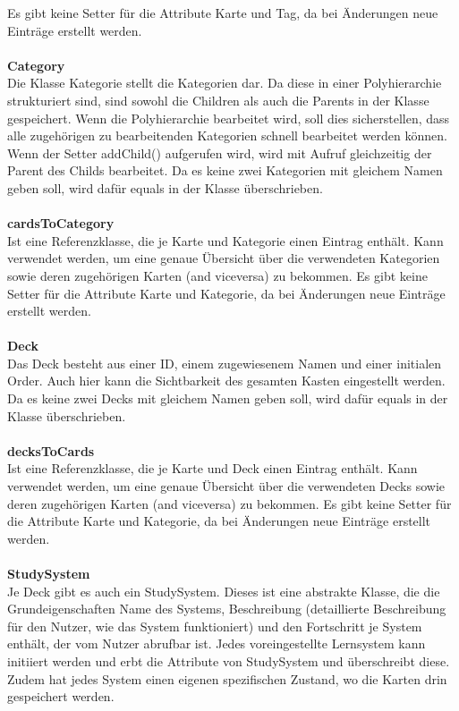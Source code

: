 \documentclass[fontsize=12pt,paper=a4,twoside]{scrartcl}
\begin{document}
Es gibt keine Setter für die Attribute Karte und Tag, da bei Änderungen neue Einträge erstellt werden.
\\
\\
\textbf{Category}\\
Die Klasse Kategorie stellt die Kategorien dar. Da diese in einer Polyhierarchie strukturiert sind, sind sowohl die Children als auch die Parents in der Klasse gespeichert. Wenn die Polyhierarchie bearbeitet wird, soll dies sicherstellen, dass alle zugehörigen zu bearbeitenden Kategorien schnell bearbeitet werden können. Wenn der Setter addChild() aufgerufen wird, wird mit Aufruf gleichzeitig der Parent des Childs bearbeitet.
Da es keine zwei Kategorien mit gleichem Namen geben soll, wird dafür equals in der Klasse überschrieben.
\\
\\
\textbf{cardsToCategory}\\
Ist eine Referenzklasse, die je Karte und Kategorie einen Eintrag enthält. Kann verwendet werden, um eine genaue Übersicht über die verwendeten Kategorien sowie deren zugehörigen Karten (and viceversa) zu bekommen.
Es gibt keine Setter für die Attribute Karte und Kategorie, da bei Änderungen neue Einträge erstellt werden.
\\
\\
\textbf{Deck}\\
Das Deck besteht aus einer ID, einem zugewiesenem Namen und einer initialen Order. Auch hier kann die Sichtbarkeit des gesamten Kasten eingestellt werden. Da es keine zwei Decks mit gleichem Namen geben soll, wird dafür equals in der Klasse überschrieben.
\\
\\
\textbf{decksToCards}\\
Ist eine Referenzklasse, die je Karte und Deck einen Eintrag enthält.
Kann verwendet werden, um eine genaue Übersicht über die verwendeten Decks sowie deren zugehörigen Karten (and viceversa) zu bekommen.
Es gibt keine Setter für die Attribute Karte und Kategorie, da bei Änderungen neue Einträge erstellt werden.
\\
\\
\textbf{StudySystem}\\ 
Je Deck gibt es auch ein StudySystem. Dieses ist eine abstrakte Klasse, 
die die Grundeigenschaften Name des Systems, Beschreibung (detaillierte Beschreibung für den Nutzer, wie das System funktioniert) und den Fortschritt je System enthält, der vom Nutzer abrufbar ist. Jedes voreingestellte Lernsystem kann initiiert werden und erbt die Attribute von StudySystem und überschreibt diese. Zudem hat jedes System einen eigenen spezifischen Zustand, wo die Karten drin gespeichert werden. 
\end{document}
